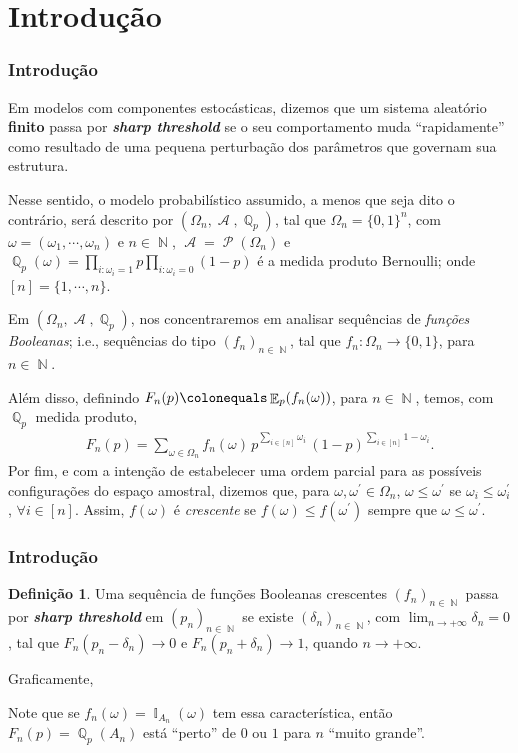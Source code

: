 \documentclass[9pt]{beamer}
\theoremstyle{definition} %
\newtheorem{mydef}{Definição}
\DeclareMathOperator{\EX}{\mathbb{E}} %
\DeclareMathOperator{\AX}{\mathcal{A}} %
\DeclareMathOperator{\NX}{\mathbb{N}} %
\DeclareMathOperator{\QX}{\mathbb{Q}} %
\DeclareMathOperator{\IX}{\mathbb{I}} %
\DeclareMathOperator{\PL}{\mathcal{P}} %
\begin{document}
	\section{Introdução}
	\begin{frame}[t]
		\frametitle{Introdução}	
		Em modelos com componentes estocásticas, dizemos que um sistema aleatório \textbf{finito} passa por \textbf{\emph{sharp threshold}} se o seu comportamento muda ``rapidamente'' como resultado de uma pequena perturbação dos parâmetros que governam sua estrutura.
		\pause
		
		Nesse sentido, o modelo probabilístico assumido, a menos que seja dito o contrário, será descrito
		por $(\Omega_n, \AX, \QX_p)$, tal que $\Omega_n = \{0,1\}^n$, com $\omega = (\omega_1, \cdots, \omega_n)$ e $n \in \NX$, $\AX = \PL(\Omega_n)$ e $\QX_p(\omega) = \prod_{i:\omega_i = 1} p \prod_{i:\omega_i = 0} (1 - p)$ é a medida produto Bernoulli; onde $[n] = \{1, \cdots, n\}$.
		\pause
		
		Em $(\Omega_n, \AX, \QX_p)$, nos concentraremos em analisar sequências de \textit{funções Booleanas}; i.e., sequências do tipo $(f_n)_{n \in \NX}$, tal que $f_n: \Omega_n \to \{0, 1\}$, para $n \in \NX$.
		
		Além disso, definindo $F_n(p) \colonequals \EX_p(f_n(\omega))$, para $n \in \NX$, temos, com $\QX_p$ medida produto,
		\vspace{-6pt}
		\begin{align}\label{eq-sharp-threshold}
			F_n(p) = \sum_{\omega \in \Omega_n} f_n(\omega) \, p^{\sum_{i \in [n]} \omega_i} \, (1 - p)^{\sum_{i \in [n]} 1 - \omega_i}.
		\end{align}
		\pause
		Por fim, e com a intenção de estabelecer uma ordem parcial para as possíveis configurações do espaço amostral, dizemos que, para $\omega, \omega^{\prime} \in \Omega_n$, $\omega \leq \omega^{\prime}$ se $\omega_i \leq \omega_i^{\prime}$, $\forall i \in [n]$. Assim, $f(\omega)$ é \textit{crescente} se $f(\omega) \leq f(\omega^{\prime})$ sempre que $\omega \leq \omega^{\prime}$.
	\end{frame}

	\begin{frame}[t]
		\frametitle{Introdução}	
		\begin{mydef}
			Uma sequência de funções Booleanas crescentes $(f_n)_{n \in \NX}$ passa por \textit{\textbf{sharp threshold}} em $(p_n)_{n \in \NX}$ se existe $(\delta_n)_{n \in \NX}$, com $\lim_{n \rightarrow +\infty} \delta_n = 0$, tal que $F_n(p_n - \delta_n) \to 0$ e $F_n(p_n + \delta_n) \to 1$, quando $n \rightarrow +\infty$.
		\end{mydef}
		Graficamente,
		\vspace{-9pt}
		
		\vspace{-18pt}\pause
		Note que se $f_n(\omega) = \IX_{A_n}(\omega)$ tem essa característica, então $F_n(p) = \QX_p(A_n)$ está ``perto'' de $0$ ou $1$ para $n$ ``muito grande''.
	\end{frame}
\end{document}
